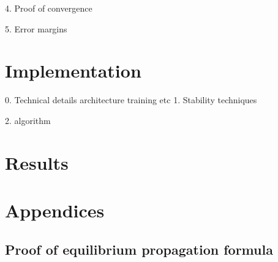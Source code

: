 \documentclass[a4paper,10pt]{report}
\begin{document}
4. Proof of convergence

5. Error margins
\section{ Implementation}
0. Technical details
    architecture
    training
    etc
1. Stability techniques

2. algorithm
\section{Results}


\nocite{*}





\section{Appendices}
\subsection{Proof of equilibrium propagation formula}
\end{document}
